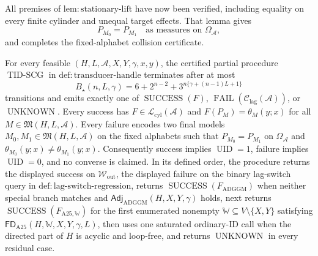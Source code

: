 All premises of \(\mathrm{lem:stationary\text{-}lift}\) have now been verified, including equality on every finite cylinder and unequal target effects.  That lemma gives
\[
 P_{M_0}=P_{M_1}\quad\text{as measures on }\Omega_{\mathcal A},
\]
and completes the fixed-alphabet collision certificate.

For every feasible \((H,L,\mathcal A,X,Y,\gamma,x,y)\), the certified partial procedure \(\operatorname{TID\text{-}SCG}\) in \(\mathrm{def:transducer\text{-}handle}\) terminates after at most
\[
 B_\star(n,L,\gamma)=6+2^{n-2}+3^{n\{\gamma+(n-1)L+1\}}
\]
transitions and emits exactly one of \(\operatorname{SUCCESS}(F)\), \(\operatorname{FAIL}(\mathcal C_{\mathrm{lag}}(\mathcal A))\), or \(\operatorname{UNKNOWN}\).  Every success has \(F\in\mathcal L_{\mathrm{cyl}}(\mathcal A)\) and \(F(P_M)=\theta_M(y;x)\) for all \(M\in\mathfrak M(H,L,\mathcal A)\).  Every failure encodes two final models \(M_0,M_1\in\mathfrak M(H,L,\mathcal A)\) on the fixed alphabets such that \(P_{M_0}=P_{M_1}\) on \(\Omega_{\mathcal A}\) and \(\theta_{M_0}(y;x)\ne\theta_{M_1}(y;x)\).  Consequently success implies \(\operatorname{UID}=1\), failure implies \(\operatorname{UID}=0\), and no converse is claimed.  In its defined order, the procedure returns the displayed success on \(\mathcal W_{\mathrm{out}}\), the displayed failure on the binary lag-switch query in \(\mathrm{def:lag\text{-}switch\text{-}regression}\), returns \(\operatorname{SUCCESS}(F_{\mathrm{ADGGM}})\) when neither special branch matches and \(\mathsf{Adj}_{\mathrm{ADGGM}}(H,X,Y,\gamma)\) holds, next returns \(\operatorname{SUCCESS}(F_{\mathrm{A25},\mathbb W})\) for the first enumerated nonempty \(\mathbb W\subseteq V\setminus\{X,Y\}\) satisfying \(\mathsf{FD}_{\mathrm{A25}}(H,\mathbb W,X,Y,\gamma,L)\), then uses one saturated ordinary-ID call when the directed part of \(H\) is acyclic and loop-free, and returns \(\operatorname{UNKNOWN}\) in every residual case.

